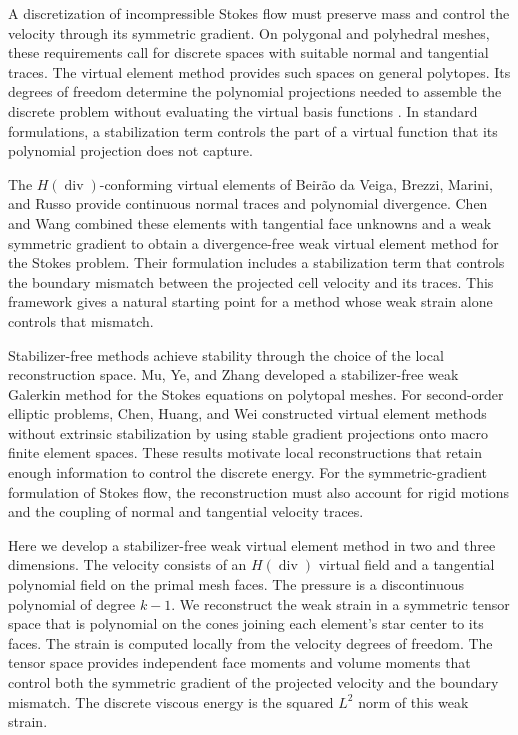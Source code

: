 \documentclass[review,hidelinks,onefignum,onetabnum]{siamart251216}
\newcommand{\AI}[1]{{\color{blue}#1}}
\begin{document}
\AI{A discretization of incompressible Stokes flow must preserve mass and
control the velocity through its symmetric gradient. On polygonal and
polyhedral meshes, these requirements call for discrete spaces with suitable
normal and tangential traces. The virtual element method provides such spaces
on general polytopes. Its degrees of freedom determine the polynomial
projections needed to assemble the discrete problem without evaluating the
virtual basis functions \cite{BBCMMR2013}. In standard formulations, a
stabilization term controls the part of a virtual function that its polynomial
projection does not capture.

The $H(\operatorname{div})$-conforming virtual elements of
Beir\~ao da Veiga, Brezzi, Marini, and Russo \cite{BBMR2016} provide continuous
normal traces and polynomial divergence. Chen and Wang \cite{ChenWang2019}
combined these elements with tangential face unknowns and a weak symmetric
gradient to obtain a divergence-free weak virtual element method for the
Stokes problem. Their formulation includes a stabilization term that controls
the boundary mismatch between the projected cell velocity and its traces.
This framework gives a natural starting point for a method whose weak strain
alone controls that mismatch.

Stabilizer-free methods achieve stability through the choice of the local
reconstruction space. Mu, Ye, and Zhang \cite{MuYeZhang2021} developed a
stabilizer-free weak Galerkin method for the Stokes equations on polytopal
meshes. For second-order elliptic problems, Chen, Huang, and Wei
\cite{ChenHuangWei2024} constructed virtual element methods without extrinsic
stabilization by using stable gradient projections onto macro finite element
spaces. These results motivate local reconstructions that retain enough
information to control the discrete energy. For the symmetric-gradient
formulation of Stokes flow, the reconstruction must also account for rigid
motions and the coupling of normal and tangential velocity traces.

Here we develop a stabilizer-free weak virtual element method in two and
three dimensions. The velocity consists of an $H(\operatorname{div})$ virtual
field and a tangential polynomial field on the primal mesh faces. The pressure
is a discontinuous polynomial of degree $k-1$. We reconstruct the weak strain
in a symmetric tensor space that is polynomial on the cones joining each
element's star center to its faces. The strain is computed locally from the
velocity degrees of freedom. The tensor space provides independent face
moments and volume moments that control both the symmetric gradient of the
projected velocity and the boundary mismatch. The discrete viscous energy
is the squared $L^2$ norm of this weak strain.

}
\end{document}
